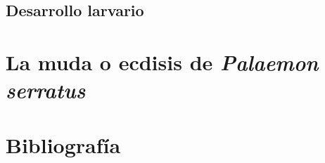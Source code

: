 \documentclass[a4paper]{article}
\begin{document}
\subsection{Desarrollo larvario}

\section{La muda o ecdisis de \textit{Palaemon serratus}}

\section{Bibliografía}

\end{document}
